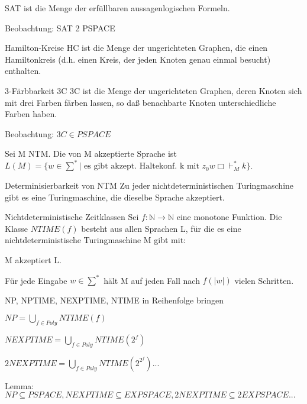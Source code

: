 \documentclass[avery5371, frame]{flashcards}
\begin{document}
\begin{flashcard}[Definition]{ SAT }
    ist die Menge der erfüllbaren aussagenlogischen Formeln.

    Beobachtung: SAT 2 PSPACE
\end{flashcard}

\begin{flashcard}[Definition]{Hamilton-Kreise HC }
    ist die Menge der ungerichteten Graphen, die einen Hamiltonkreis (d.h. einen Kreis, der jeden Knoten genau einmal besucht) enthalten.
\end{flashcard}

\begin{flashcard}[Definition]{3-Färbbarkeit  3C}
    3C ist die Menge der ungerichteten Graphen, deren Knoten sich mit drei Farben färben lassen, so daß benachbarte Knoten unterschiedliche Farben haben.

    Beobachtung: $3C \in PSPACE$
\end{flashcard}

\begin{flashcard}[Definition]{Sei M NTM. Die von M akzeptierte Sprache ist }
    $L(M) = \{w\in\sum^* | \text{ es gibt akzept. Haltekonf. k mit } z_0 w\Box \vdash_M^* k\}$.
\end{flashcard}

\begin{flashcard}[Satz]{Determinisierbarkeit von NTM}
    Zu jeder nichtdeterministischen Turingmaschine gibt es eine Turingmaschine, die dieselbe Sprache akzeptiert.
\end{flashcard}

\begin{flashcard}[Definition]{Nichtdeterministische Zeitklassen}
    Sei $f:\mathbb{N}\rightarrow\mathbb{N}$ eine monotone Funktion. Die Klasse $NTIME(f)$ besteht aus allen Sprachen L, für die es eine nichtdeterministische Turingmaschine M gibt mit:
    \begin{itemize*}
        \item M akzeptiert L.
        \item Für jede Eingabe $w\in\sum^*$ hält M auf jeden Fall nach $f(|w|)$ vielen Schritten.
    \end{itemize*}
\end{flashcard}

\begin{flashcard}[Definition]{NP, NPTIME, NEXPTIME, NTIME in Reihenfolge bringen}
    \begin{itemize*}
        \item $NP = \bigcup_{f\in Poly} NTIME(f)$
        \item $NEXPTIME = \bigcup_{f\in Poly} NTIME(2^f)$
        \item $2NEXPTIME = \bigcup_{f\in Poly} NTIME(2^{2^{f}})...$
    \end{itemize*}

    Lemma: $NP \subseteq PSPACE, NEXPTIME \subseteq EXPSPACE, 2NEXPTIME \subseteq 2EXPSPACE ...$
\end{flashcard}
\end{document}
